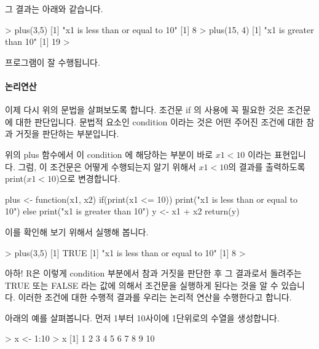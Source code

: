 \documentclass{book}
\begin{document}
그 결과는 아래와 같습니다. 

\begin{Schunk}
\begin{Soutput}
> plus(3,5)
[1] "x1 is less than or equal to 10"
[1] 8
> plus(15, 4)
[1] "x1 is greater than 10"
[1] 19
> 
\end{Soutput}
\end{Schunk}

프로그램이 잘 수행됩니다. 

\paragraph{논리연산}
이제 다시 위의 문법을 살펴보도록 합니다. 
조건문 if 의 사용에 꼭 필요한 것은 조건문에 대한 판단입니다.
문법적 요소인  condition 이라는 것은 어떤 주어진 조건에 대한 참과 거짓을 판단하는 부분입니다.

위의 plus 함수에서 이 condition 에 해당하는 부분이 바로 $x1 < 10$ 이라는 표현입니다. 
그럼, 이 조건문은 어떻게 수행되는지 알기 위해서 $x1 < 10$의 결과를 출력하도록 print($x1<10$)으로 변경합니다.
 
\begin{Schunk}
\begin{Soutput}
plus <- function(x1, x2){
	if(print(x1 <= 10)) print("x1 is less than or equal to 10")
	else print("x1 is greater than 10")
	y <- x1 + x2
	return(y)
}
\end{Soutput}
\end{Schunk}

이를 확인해 보기 위해서 실행해 봅니다. 
\begin{Schunk}
\begin{Soutput}
> plus(3,5)
[1] TRUE
[1] "x1 is less than or equal to 10"
[1] 8
> 
\end{Soutput}
\end{Schunk}

아하! R은 이렇게 condition 부분에서 참과 거짓을 판단한 후 그 결과로서 돌려주는 TRUE 또는 FALSE 라는 값에 의해서 조건문을 실행하게 된다는 것을 알 수 있습니다. 
이러한 조건에 대한 수행적 결과를 우리는 논리적 연산을 수행한다고 합니다. 

아래의 예를 살펴봅니다.
먼저 1부터 10사이에 1단위로의 수열을 생성합니다.

\begin{Schunk}
\begin{Soutput}
> x <- 1:10
> x
 [1]  1  2  3  4  5  6  7  8  9 10
\end{Soutput}
\end{Schunk}
\end{document}
